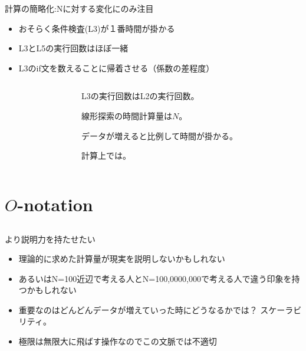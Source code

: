 \documentclass{beamer}
\begin{document}
\begin{frame}[fragile]{計算の簡略化:Nに対する変化にのみ注目}{}
\begin{itemize}%
\item おそらく条件検査(L3)が１番時間が掛かる
\item L3とL5の実行回数はほぼ一緒
\item L3のif文を数えることに帰着させる（係数の差程度）
\end{itemize}

\vfill
\begin{columns}
\begin{column}{0.5\textwidth}
\end{column}
\begin{column}{0.5\textwidth}
L3の実行回数はL2の実行回数。

\begin{block}{}
線形探索の時間計算量は$N$。
\end{block}

データが増えると比例して時間が掛かる。

\medskip
計算上では。
\end{column}
\end{columns}
\end{frame}

\section{$O$-notation}		%
\subsection{}

\begin{frame}[fragile]{より説明力を持たせたい}{}
\begin{itemize}\itemsep8pt
\item 理論的に求めた計算量が現実を説明しないかもしれない
\item あるいはN=100近辺で考える人とN=100,0000,000で考える人で違う印象を持つかもしれない
\item 重要なのはどんどんデータが増えていった時にどうなるかでは？ スケーラビリティ。
\item 極限は無限大に飛ばす操作なのでこの文脈では不適切
\end{itemize}
\end{frame}
\end{document}
